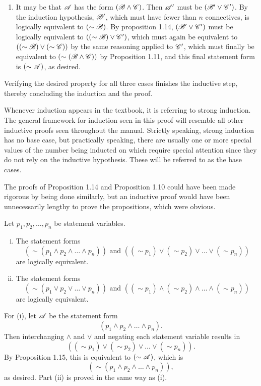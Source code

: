 \begin{proposition}
\begin{enumerate}
    \item It may be that \(\mathscr{A}\) has the form \((\mathscr{B} \land \mathscr{C})\). Then \(\mathscr{A}'\) must be \((\mathscr{B}' \lor \mathscr{C}')\). By the induction hypothesis, \(\mathscr{B}'\), which must have fewer than \(n\) connectives, is logically equivalent to \((\sim\mathscr{B})\). By proposition 1.14, \((\mathscr{B}' \lor \mathscr{C}')\) must be logically equivalent to \(((\sim\mathscr{B}) \lor \mathscr{C}')\), which must again be equivalent to \(((\sim\mathscr{B}) \lor (\sim\mathscr{C}))\) by the same reasoning applied to \(\mathscr{C}'\), which must finally be equivalent to \((\sim(\mathscr{B} \land \mathscr{C}))\) by Proposition 1.11, and this final statement form is \((\sim\mathscr{A})\), as desired.
  \end{enumerate}

  Verifying the desired property for all three cases finishes the inductive step, thereby concluding the induction and the proof.

  \note{} Whenever induction appears in the textbook, it is referring to strong induction. The general framework for induction seen in this proof will resemble all other inductive proofs seen throughout the manual. Strictly speaking, strong induction has no base case, but practically speaking, there are usually one or more special values of the number being inducted on which require special attention since they do not rely on the inductive hypothesis. These will be referred to as the base cases.

  \note{} The proofs of Proposition 1.14 and Proposition 1.10 could have been made rigorous by being done similarly, but an inductive proof would have been unnecessarily lengthy to prove the propositions, which were obvious.
\end{proposition}

\begin{corollary}
  Let \(p_1, p_2, \dots, p_n\) be statement variables.
  \begin{enumerate}[(i)]
    \item The statement forms
  \[(\sim(p_1 \land p_2 \land \dots \land p_n)) \text{ and } ((\sim p_1) \lor (\sim p_2) \lor \dots \lor (\sim p_n))\]
  are logically equivalent.

    \item The statement forms
  \[(\sim(p_1 \lor p_2 \lor \dots \lor p_n)) \text{ and } ((\sim p_1) \land (\sim p_2) \land \dots \land (\sim p_n))\]
  are logically equivalent.
  \end{enumerate}

  \prf{} For (i), let \(\mathscr{A}\) be the statement form
  \[(p_1 \land p_2 \land \dots \land p_n).\]
  Then interchanging \(\land\) and \(\lor\) and negating each statement variable results in
  \[((\sim p_1) \lor (\sim p_2) \lor \dots \lor (\sim p_n)).\]
  By Proposition 1.15, this is equivalent to \((\sim\mathscr{A})\), which is
  \[(\sim(p_1 \land p_2 \land \dots \land p_n)),\]
  as desired. Part (ii) is proved in the same way as (i).
\end{corollary}


